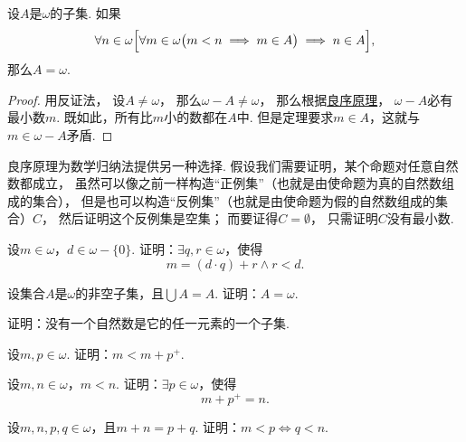 \begin{theorem}[强归纳原理]\label{theorem:集合论.归纳原理2}
设\(A\)是\(\omega\)的子集.
如果\[
	\forall n \in \omega \Bigl[
		\forall m \in \omega \bigl( m < n \implies m \in A \bigr)
		\implies
		n \in A
	\Bigr],
\]
那么\(A = \omega\).
\begin{proof}
用反证法，
设\(A \neq \omega\)，
那么\(\omega - A \neq \omega\)，
那么根据\hyperref[theorem:集合论.自然数集的良序]{良序原理}，
\(\omega - A\)必有最小数\(m\).
既如此，所有比\(m\)小的数都在\(A\)中.
但是定理要求\(m \in A\)，这就与\(m \in \omega - A\)矛盾.
\end{proof}
\end{theorem}

良序原理为数学归纳法提供另一种选择.
假设我们需要证明，某个命题对任意自然数都成立，
虽然可以像之前一样构造“正例集”（也就是由使命题为真的自然数组成的集合），
但是也可以构造“反例集”（也就是由使命题为假的自然数组成的集合）\(C\)，
然后证明这个反例集是空集；
而要证得\(C = \emptyset\)，
只需证明\(C\)没有最小数.

\begin{example}
设\(m\in\omega\)，\(d\in\omega-\{0\}\).
证明：\(\exists q,r\in\omega\)，使得\[
	m=(d \cdot q)+r
	\land
	r<d.
\]
\end{example}

\begin{example}
设集合\(A\)是\(\omega\)的非空子集，且\(\bigcup A = A\).
证明：\(A=\omega\).
\end{example}

\begin{example}
证明：没有一个自然数是它的任一元素的一个子集.
\end{example}

\begin{example}
设\(m,p\in\omega\).
证明：\(m<m+p^+\).
\end{example}

\begin{example}
设\(m,n\in\omega\)，\(m<n\).
证明：\(\exists p\in\omega\)，使得\[
	m+p^+=n.
\]
\end{example}

\begin{example}
设\(m,n,p,q\in\omega\)，且\(m+n=p+q\).
证明：\(m<p \iff q<n\).
\end{example}

